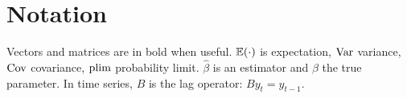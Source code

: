 \section*{Notation}
Vectors and matrices are in bold when useful. $\mathbb{E}(\cdot)$ is expectation, $\operatorname{Var}$ variance, $\operatorname{Cov}$ covariance, $\operatorname{plim}$ probability limit. $\hat\beta$ is an estimator and $\beta$ the true parameter. In time series, $B$ is the lag operator: $B y_t = y_{t-1}$.
